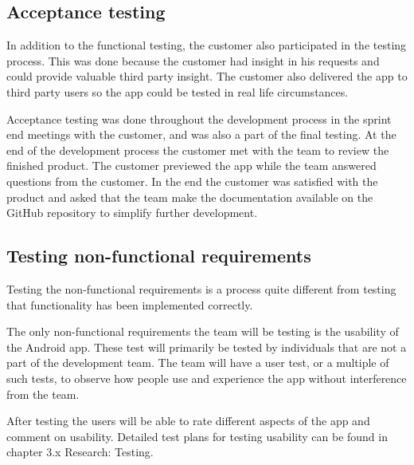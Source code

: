 \subsection{Acceptance testing}
In addition to the functional testing, the customer also participated in the testing process. This was done because the customer had insight in his requests and could provide valuable third party insight. The customer also delivered the app to third party users so the app could be tested in real life circumstances.

Acceptance testing was done throughout the development process in the sprint end meetings with the customer, and was also a part of the final testing. At the end of the development process the customer met with the team to review the finished product. The customer previewed the app while the team answered questions from the customer. In the end the customer was satisfied with the product and asked that the team make the documentation available on the GitHub repository to simplify further development.

 
\subsection{Testing non-functional requirements}
\label{sec:testingnonfunctionalrequirements}
Testing the non-functional requirements is a process quite different from testing that functionality has been implemented correctly.

The only non-functional requirements the team will be testing is the usability of the Android app. These test will primarily be 
tested by individuals that are not a part of the development team. The team will have a user test, or a multiple of such tests, to observe how people use and experience the app without interference from the team. 

After testing the users will be able to rate different aspects of the app and comment on usability. Detailed 
test plans for testing usability can be found in chapter 3.x Research: Testing.